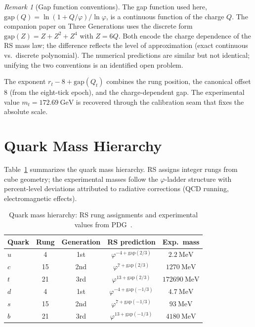 \documentclass[12pt,a4paper]{article}
\theoremstyle{definition}
\theoremstyle{remark}
\newtheorem{remark}[theorem]{Remark}
\begin{document}
\begin{remark}[Gap function conventions]
The gap function used here,
$\mathrm{gap}(Q) = \ln(1 + Q/\varphi)/\ln\varphi$, is a continuous
function of the charge $Q$.  The companion paper on Three Generations
uses the discrete form $\mathrm{gap}(Z) = Z + Z^2 + Z^4$ with
$Z = 6Q$.  Both encode the charge dependence of the RS mass law;
the difference reflects the level of approximation (exact continuous
vs.\ discrete polynomial).  The numerical predictions are similar but
not identical; unifying the two conventions is an identified open problem.
\end{remark}

The exponent $r_t - 8 + \mathrm{gap}(Q_t)$ combines the rung position,
the canonical offset $8$ (from the eight-tick epoch), and the
charge-dependent gap.  The experimental value $m_t = 172.69~\mathrm{GeV}$
is recovered through the calibration seam that fixes the absolute
scale.

\section{Quark Mass Hierarchy}
\label{sec:hierarchy}

Table~\ref{tab:hierarchy} summarizes the quark mass hierarchy.  RS
assigns integer rungs from cube geometry; the experimental masses
follow the $\varphi$-ladder structure with percent-level deviations
attributed to radiative corrections (QCD running, electromagnetic
effects).

\begin{table}[ht]
\centering
\renewcommand{\arraystretch}{1.3}
\begin{tabular}{lcccc}
\toprule
\textbf{Quark} & \textbf{Rung} & \textbf{Generation} &
\textbf{RS prediction} & \textbf{Exp.\ mass} \\
\midrule
$u$ & 4 & 1st & $\varphi^{-4 + \mathrm{gap}(2/3)}$ & $2.2~\mathrm{MeV}$ \\
$c$ & 15 & 2nd & $\varphi^{7 + \mathrm{gap}(2/3)}$ & $1270~\mathrm{MeV}$ \\
$t$ & 21 & 3rd & $\varphi^{13 + \mathrm{gap}(2/3)}$ & $172690~\mathrm{MeV}$ \\
\midrule
$d$ & 4 & 1st & $\varphi^{-4 + \mathrm{gap}(-1/3)}$ & $4.7~\mathrm{MeV}$ \\
$s$ & 15 & 2nd & $\varphi^{7 + \mathrm{gap}(-1/3)}$ & $93~\mathrm{MeV}$ \\
$b$ & 21 & 3rd & $\varphi^{13 + \mathrm{gap}(-1/3)}$ & $4180~\mathrm{MeV}$ \\
\bottomrule
\end{tabular}
\caption{Quark mass hierarchy: RS rung assignments and experimental
values from PDG~\cite{PDG}.}
\label{tab:hierarchy}
\end{table}
\end{document}

